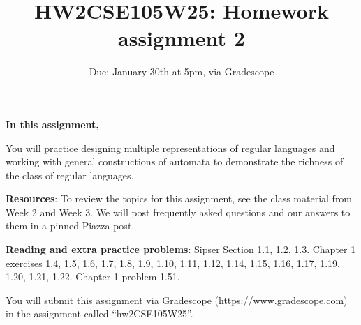 

\title{HW2CSE105W25: Homework assignment 2}
\date{Due: January 30th at 5pm, via Gradescope}



\maketitle
\thispagestyle{fancy}

{\bf In this assignment,}

You will practice designing multiple representations of regular languages and working with 
general constructions of automata to demonstrate the richness of the class of regular languages.


{\bf Resources}: To review the topics 
for this assignment, see the class material from Week 2 and Week 3.
We will post frequently asked questions and our answers to them in a 
pinned Piazza post. 

{\bf Reading and extra practice problems}:  
Sipser Section 1.1, 1.2, 1.3. 
Chapter 1 exercises 1.4, 1.5, 1.6, 1.7, 1.8, 1.9, 1.10, 1.11, 1.12, 1.14, 1.15, 
1.16, 1.17, 1.19, 1.20, 1.21, 1.22. Chapter 1 problem 1.51.

\instructions

You will submit this assignment via Gradescope
(\href{https://www.gradescope.com}{https://www.gradescope.com}) 
in the assignment called ``hw2CSE105W25''.

